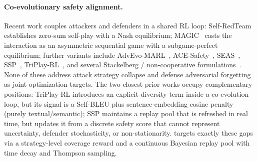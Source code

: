 \paragraph{Co-evolutionary safety alignment.} Recent work couples attackers and defenders in a shared RL loop: Self-RedTeam~\citep{liu2025chasing} establishes zero-sum self-play with a Nash equilibrium; MAGIC~\citep{magic2025} casts the interaction as an asymmetric sequential game with a subgame-perfect equilibrium; further variants include AdvEvo-MARL~\citep{pan2025advevo}, ACE-Safety~\citep{acesafety2025}, SEAS~\citep{seas2025}, SSP~\citep{ssp2026}, TriPlay-RL~\citep{triplayrl2026}, and several Stackelberg / non-cooperative formulations~\citep{twoplayergame2024,advgame2025}. None of these address attack strategy collapse and defense adversarial forgetting as joint optimization targets. The two closest prior works occupy complementary positions: TriPlay-RL introduces an explicit diversity term inside a co-evolution loop, but its signal is a Self-BLEU plus sentence-embedding cosine penalty (purely textual/semantic); SSP maintains a replay pool that is refreshed in real time, but updates it from a discrete safety score that cannot represent uncertainty, defender stochasticity, or non-stationarity. \method targets exactly these gaps via a strategy-level coverage reward and a continuous Bayesian replay pool with time decay and Thompson sampling.

